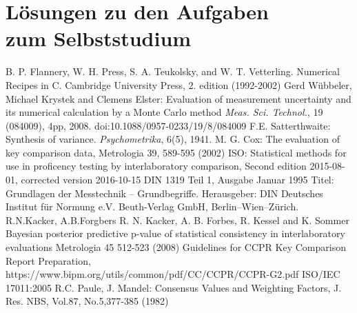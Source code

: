 \documentclass[a4paper,11pt]{book}
\begin{document}
\chapter{Lösungen zu den Aufgaben\\ zum Selbststudium}




\begin{thebibliography}{------}
     B. P. Flannery, W. H. Press, S. A. Teukolsky, and W. T. Vetterling. Numerical Recipes in C. Cambridge University Press, 2. edition (1992-2002)
     Gerd Wübbeler, Michael Krystek and Clemens Elster: Evaluation of measurement uncertainty
    and its numerical calculation by a Monte Carlo method
    {\em Meas. Sci. Technol.}, 19 (084009), 4pp, 2008.
    doi:10.1088/0957-0233/19/8/084009
     F.E. Satterthwaite: Synthesis of variance.
    {\em Psychometrika}, 6(5), 1941.
	 M. G. Cox: The evaluation of key comparison data, Metrologia 39, 589-595 (2002)
	 ISO: Statistical methods for use in proficency testing by interlaboratory comparison, Second edition 2015-08-01, corrected version 2016-10-15
	 DIN 1319 Teil 1, Ausgabe Januar 1995 Titel: Grundlagen der Messtechnik – Grundbegriffe. Herausgeber: DIN Deutsches Institut für Normung e.V. Beuth-Verlag GmbH, Berlin–Wien–Zürich.
	 R.N.Kacker, A.B.Forgbers
	R. N. Kacker, A. B. Forbes, R. Kessel and K. Sommer Bayesian posterior predictive
	p-value of statistical consistency in interlaboratory evaluations Metrologia 45 512-523 (2008)
	 Guidelines for CCPR Key Comparison Report
	Preparation, https://www.bipm.org/utils/common/pdf/CC/CCPR/CCPR-G2.pdf
	ISO/IEC 17011:2005 
	  R.C. Paule, J. Mandel: Consensus Values and Weighting Factors, J. Res. NBS, Vol.87, No.5,377-385 (1982)

\end{thebibliography}
\end{document}
